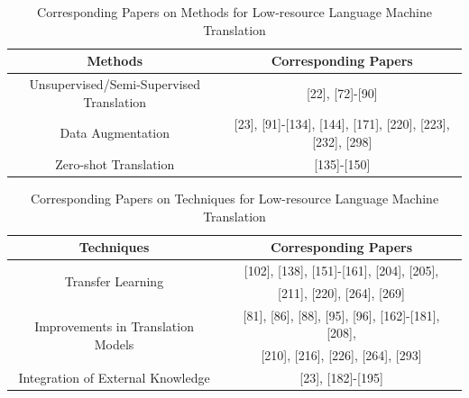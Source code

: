 \documentclass[acmsmall]{acmart}
\begin{document}
%


\begin{table}[h!]
\caption{Corresponding Papers on Methods for Low-resource Language Machine Translation}
\label{tab1}
\centering %
\begin{tabular}{cc}
\toprule
Methods & Corresponding Papers\\
\midrule
Unsupervised/Semi-Supervised Translation & \footnotesize[22], [72]-[90] \\
Data Augmentation &  \footnotesize[23], [91]-[134], [144], [171], [220], [223], [232], [298]\\
Zero-shot Translation & \footnotesize[135]-[150]\\
\bottomrule
\end{tabular}
\end{table}


\begin{table}[h!]
\caption{Corresponding Papers on Techniques for Low-resource Language Machine Translation}
\label{tab1}
\centering
\begin{tabular}{cc}
\toprule
Techniques & Corresponding Papers\\
\midrule
\multirow{2}{*}{Transfer Learning}  & [102], [138], [151]-[161], [204], [205],\\
 & [211], [220], [264], [269]\\
\multirow{2}{*}{Improvements in Translation Models} & [81], [86], [88], [95], [96], [162]-[181], [208],\\
 & [210], [216], [226], [264], [293]\\
Integration of External Knowledge & [23], [182]-[195]\\
\bottomrule
\end{tabular}
\end{table}
\end{document}
